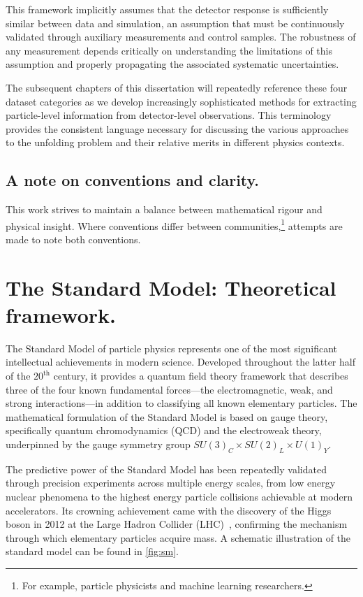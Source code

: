 \begin{definition}
This framework implicitly assumes that the detector response is sufficiently similar between data and simulation, an assumption that must be continuously validated through auxiliary measurements and control samples. The robustness of any measurement depends critically on understanding the limitations of this assumption and properly propagating the associated systematic uncertainties.

The subsequent chapters of this dissertation will repeatedly reference these four dataset categories as we develop increasingly sophisticated methods for extracting particle-level information from detector-level observations. This terminology provides the consistent language necessary for discussing the various approaches to the unfolding problem and their relative merits in different physics contexts.      
    \subsection{A note on conventions and clarity.}
         This work strives to maintain a balance between mathematical rigour and physical insight.
         Where conventions differ between communities,\footnote{For example, particle physicists and machine learning researchers.} attempts are made to note both conventions.
         
\section{The Standard Model: Theoretical framework.}
The Standard Model of particle physics represents one of the most significant intellectual achievements in modern science.
%
Developed throughout the latter half of the $20^{\text{th}}$ century, it provides a quantum field theory framework that describes three of the four known fundamental forces—the electromagnetic, weak, and strong interactions---in addition to classifying all known elementary particles.
%
The mathematical formulation of the Standard Model is based on gauge theory, specifically quantum chromodynamics (QCD) and the electroweak theory, underpinned by the gauge symmetry group \(SU(3)_C\times SU(2)_L\times U(1)_Y\).

The predictive power of the Standard Model has been repeatedly validated through precision experiments across multiple energy scales, from low energy nuclear phenomena to the highest energy particle collisions achievable at modern accelerators.
%
Its crowning achievement came with the discovery of the Higgs boson in 2012 at the Large Hadron Collider (LHC)~\cite{ATLAS:2012yve, collaboration_observation_2012}, confirming the mechanism through which elementary particles acquire mass.
%
A schematic illustration of the standard model can be found in \cref{fig:sm}.


\end{definition}
